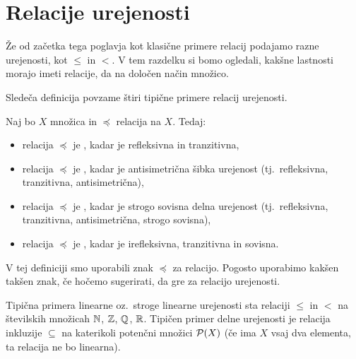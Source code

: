         \section{Relacije urejenosti}\label{razdelek:relacije-urejenosti}

                Že od začetka tega poglavja kot klasične primere relacij podajamo razne urejenosti, kot $\leq$ in $<$. V tem razdelku si bomo ogledali, kakšne lastnosti morajo imeti relacije, da na določen način  množico.

                Sledeča definicija povzame štiri tipične primere relacij urejenosti.

                \begin{definicija}
                        Naj bo $X$ množica in $\preceq$ relacija na $X$. Tedaj:
                        \begin{itemize}
                                \item
                                        relacija $\preceq$ je , kadar je refleksivna in tranzitivna,
                                \item
                                        relacija $\preceq$ je , kadar je antisimetrična šibka urejenost (tj.~refleksivna, tranzitivna, antisimetrična),
                                \item
                                        relacija $\preceq$ je , kadar je strogo sovisna delna urejenost (tj.~refleksivna, tranzitivna, antisimetrična, strogo sovisna),
                                \item
                                        relacija $\preceq$ je , kadar je irefleksivna, tranzitivna in sovisna.
                        \end{itemize}
                \end{definicija}

                V tej definiciji smo uporabili znak $\preceq$ za relacijo. Pogosto uporabimo kakšen takšen znak, če hočemo sugerirati, da gre za relacijo urejenosti.

                Tipična primera linearne oz.~stroge linearne urejenosti sta relaciji $\leq$ in $<$ na številskih množicah $\mathbb{N}$, $\mathbb{Z}$, $\mathbb{Q}$, $\mathbb{R}$. Tipičen primer delne urejenosti je relacija inkluzije $\subseteq$ na katerikoli potenčni množici $\mathcal{P}(X)$ (če ima $X$ vsaj dva elementa, ta relacija ne bo linearna).

